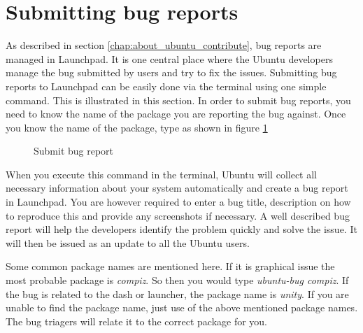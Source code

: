 \section{Submitting bug reports} \label{sect:bugreport-terminal}  
As described in section \ref{chap:about_ubuntu_contribute}, bug reports are managed in Launchpad. It is one central place where the Ubuntu developers manage the bug submitted by users and try to fix the issues. Submitting bug reports to Launchpad can be easily done via the terminal using one simple command. This is illustrated in this section. In order to submit bug reports, you need to know the name of the package you are reporting the bug against. Once you know the name of the package, type  as shown in figure \ref{fig:bugreport1}

\begin{figure}[h!]	
	\centering
	\caption{Submit bug report}	
	\label{fig:bugreport1}	
\end{figure}

\par \noindent When you execute this command in the terminal, Ubuntu will collect all necessary information about your system automatically and create a bug report in Launchpad. You are however required to enter a bug title, description on how to reproduce this and provide any screenshots if necessary. A well described bug report will help the developers identify the problem quickly and solve the issue. It will then be issued as an update to all the Ubuntu users. \\

\par \noindent Some common package names are mentioned here. If it is graphical issue the most probable package is \emph{compiz}. So then you would type \emph{ubuntu-bug compiz}. If the bug is related to the dash or launcher, the package name is \emph{unity}. If you are unable to find the package name, just use of the above mentioned package names. The bug triagers will relate it to the correct package for you.

\newpage
